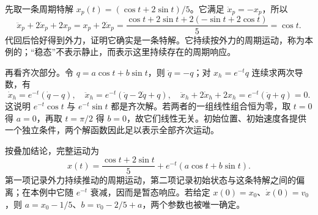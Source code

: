 \documentclass[a4paper,12pt,twoside,openany,fontset=none]{ctexbook}
\numberwithin{equation}{chapter}
\begin{document}
先取一条周期特解 $x_p(t)=(\cos t+2\sin t)/5$。它满足 $\ddot x_p=-x_p$，所以
\begin{equation}
 \ddot x_p+2\dot x_p+2x_p
 =x_p+2\dot x_p
 =\frac{\cos t+2\sin t+2(-\sin t+2\cos t)}5
 =\cos t.
\end{equation}
代回后恰好得到外力，证明它确实是一条特解。它持续按外力的周期运动，称为本例的；“稳态”不表示静止，而表示这里持续存在的周期响应。

再看齐次部分。令 $q=a\cos t+b\sin t$，则 $\ddot q=-q$；对 $x_h=e^{-t}q$ 连续求两次导数，有
\begin{equation}
 \dot x_h=e^{-t}(\dot q-q),\quad
 \ddot x_h=e^{-t}(\ddot q-2\dot q+q),\quad
 \ddot x_h+2\dot x_h+2x_h=e^{-t}(\ddot q+q)=0.
\end{equation}
这说明 $e^{-t}\cos t$ 与 $e^{-t}\sin t$ 都是齐次解。若两者的一组线性组合恒为零，取 $t=0$ 得 $a=0$，再取 $t=\pi/2$ 得 $b=0$，故它们线性无关。初始位置、初始速度各提供一个独立条件，两个解函数因此足以表示全部齐次运动。

按叠加结论，完整运动为
\begin{equation}
 x(t)=\frac{\cos t+2\sin t}{5}
      +e^{-t}(a\cos t+b\sin t).
 \label{eq:five-forced-spring-solution}
\end{equation}
第一项记录外力持续推动的周期运动，第二项记录初始状态与这条特解之间的偏离；在本例中它随 $e^{-t}$ 衰减，因而是暂态响应。若给定 $x(0)=x_0$、$\dot x(0)=v_0$，则 $a=x_0-1/5$、$b=v_0-2/5+a$，两个参数也被唯一确定。
\end{document}
